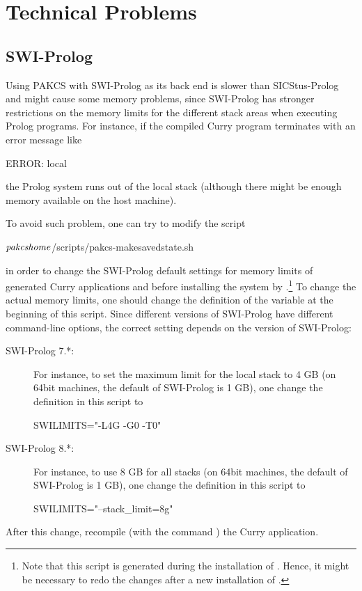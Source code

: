 \section{Technical Problems}

\subsection{SWI-Prolog}

Using PAKCS with SWI-Prolog as its back end is slower than
SICStus-Prolog and might cause some memory problems,
since SWI-Prolog has stronger restrictions on the memory limits
for the different stack areas when executing Prolog programs.
For instance, if the compiled Curry program terminates
with an error message like
\begin{curry}
ERROR: local
\end{curry}
the Prolog system runs out of the local stack (although there
might be enough memory available on the host machine).

To avoid such problem, one can try to modify the script
\begin{curry}
$\mbox{\textit{pakcshome}}$/scripts/pakcs-makesavedstate.sh
\end{curry}
in order to change the SWI-Prolog default settings
for memory limits of generated Curry applications
and before installing the system by .\footnote{%
Note that this script is generated
during the installation of \CYS. Hence, it might be necessary
to redo the changes after a new installation of \CYS.}
To change the actual memory limits, one should change
the definition of the variable
 at the beginning of this script.
Since different versions of SWI-Prolog have different command-line options,
the correct setting depends on the version of SWI-Prolog:
\begin{description}
\item[SWI-Prolog 7.*:]
For instance, to set the maximum limit for
the local stack to 4 GB (on 64bit machines, the default of SWI-Prolog
is 1 GB), one change the definition in this script to
\begin{curry}
SWILIMITS="-L4G -G0 -T0"
\end{curry}
\item[SWI-Prolog 8.*:]
For instance, to use 8 GB for all stacks
(on 64bit machines, the default of SWI-Prolog is 1 GB),
one change the definition in this script to
\begin{curry}
SWILIMITS="--stack_limit=8g"
\end{curry}
\end{description}
%
After this change, recompile (with the \CYS command )
the Curry application.


